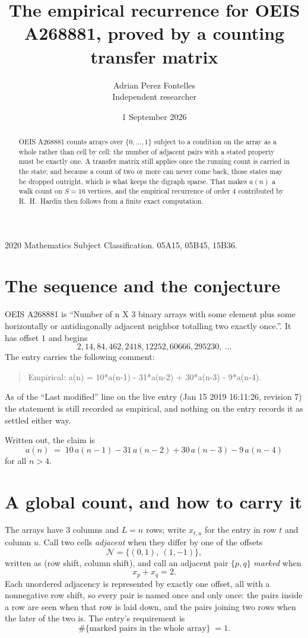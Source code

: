 \documentclass[11pt,a4paper]{article}
\title{The empirical recurrence for OEIS A268881, proved by a counting transfer matrix}
\author{Adrian Perez Fontelles\\ \small Independent researcher}
\date{1 September 2026}
\theoremstyle{plain}
\theoremstyle{definition}
\begin{document}
\maketitle

\begin{abstract}
OEIS A268881 counts arrays over $\{0,\dots,1\}$ subject to a condition on the array as a
whole rather than cell by cell: the number of adjacent pairs with a stated property must be
exactly one. A transfer matrix still applies once the running count is carried in the state; and
because a count of two or more can never come back, those states may be dropped outright,
which is what keeps the digraph sparse. That makes $a(n)$ a walk count on $S=16$ vertices,
and the empirical recurrence of order $4$ contributed by R.~H.~Hardin then follows from
a finite exact computation.
\end{abstract}

\noindent\small 2020 Mathematics Subject Classification. 05A15, 05B45, 15B36.\normalsize

\section{The sequence and the conjecture}

OEIS A268881 is ``Number of n X 3 binary arrays with some element plus some horizontally or antidiagonally adjacent neighbor totalling two exactly once.''. It has offset $1$ and begins
\[
2, 14, 84, 462, 2418, 12252, 60666, 295230,\ \dots
\]
The entry carries the following comment:
\begin{quote}\small
Empirical: a(n) = 10*a(n-1) - 31*a(n-2) + 30*a(n-3) - 9*a(n-4).
\end{quote}
As of the ``Last modified'' line on the live entry (Jan 15 2019 16:11:26, revision 7) the statement is
still recorded as empirical, and nothing on the entry records it as settled either way.

Written out, the claim is
\begin{equation}\label{eq:conj}
a(n)\;=\;10\,a(n-1) - 31\,a(n-2) + 30\,a(n-3) - 9\,a(n-4)
\end{equation}
for all $n>4$.

\section{A global count, and how to carry it}

The arrays have $3$ columns and $L=n$ rows; write $x_{t,u}$ for the entry in
row $t$ and column $u$. Call two cells \emph{adjacent} when they differ by one of the
offsets
\[
\mathcal N=\{(0,1),\ (1,-1)\},
\]
written as (row shift, column shift), and call an adjacent pair $\{p,q\}$
\emph{marked} when
\[
x_{p}+x_{q}=2 .
\]
Each unordered adjacency is represented by exactly one offset, all with a nonnegative row
shift, so every pair is named once and only once: the pairs inside a row are seen when
that row is laid down, and the pairs joining two rows when the later of the two is. The
entry's requirement is
\begin{equation}\label{eq:glob}
\#\{\text{marked pairs in the whole array}\}\;=1.
\end{equation}
\end{document}
